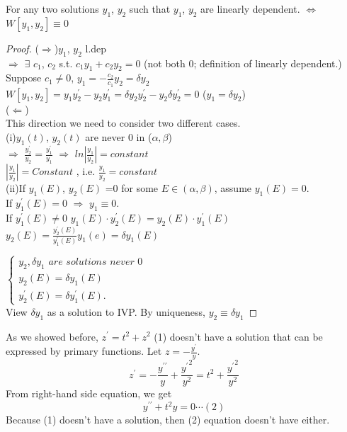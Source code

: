 \begin{proposition}
For any two solutions $y_1$, $y_2$ such that $y_1$, $y_2$ are linearly dependent. $\iff$ $W[y_1,y_2]\equiv0$
\end{proposition}
\begin{proof}
($\Rightarrow$)$y_1$, $y_2$ l.dep\\
$\Rightarrow$ $\exists$ $c_1$, $c_2$ s.t. $c_1y_1+c_2y_2=0$ (not both 0; definition of linearly dependent.)\\
Suppose $c_1\neq0$, $y_1=-\frac{c_2}{c_1}y_2=\delta y_2$\\
$W[y_1,y_2]=y_1y_2^\prime-y_2y_1^\prime=\delta y_2y_2^\prime-y_2\delta y_2^\prime=0$ \qquad ($y_1=\delta y_2$)\\

($\Leftarrow$) \\
This direction we need to consider two different cases. \\
(i)\quad$y_1(t)$, $y_2(t)$ are never 0 in ($\alpha,\beta$)\\
$\Rightarrow$ \quad
$\frac{y_2^\prime}{y_2}=\frac{y_1^\prime}{y_1}$ \quad $\Rightarrow$ $ln|\frac{y_1}{y_2}|=constant$\\
$|\frac{y_1}{y_2}|=Constant$ , i.e. $\frac{y_1}{y_2}=constant$\\
(ii)If $y_1(E)$, $y_2(E)$ =0
 for some $E\in(\alpha,\beta)$, assume $y_1(E)=0$.\\
If $y_1^\prime(E)=0$ $\Rightarrow$ $y_1\equiv0$.\\
If $y_1^\prime(E)\neq0$ \quad$y_1(E)\cdot y_2^\prime(E)=y_2(E)\cdot y_1^\prime(E)$\\
$y_2(E)=\frac{y_2^\prime(E)}{y_1^\prime(E)}y_1(e)=\delta y_1(E)$

$\left \{	\begin{gathered}
y_2, \delta y_1 \textit{ are solutions never 0}\\
y_2(E)=\delta y_1(E)\\
y_2^\prime(E)=\delta y_1^\prime(E).
\end{gathered}\right.$ \\
View $\delta y_1$ as a solution to IVP. By uniqueness, $y_2\equiv\delta y_1$
\end{proof}

As we showed before, $z^\prime=t^2+z^2$ (1) doesn't have a solution that can be expressed by primary functions. Let $z=-\frac{y^\prime}{y}$. 
\[z^\prime=-\frac{y^{\prime\prime}}{y}+\frac{{y^\prime}^2}{y^2}=t^2+\frac{{y^\prime}^2}{y^2}
\]
From right-hand side equation, we get
\[y^{\prime\prime}+t^2y=0 \cdots (2)
\]
Because (1) doesn't have a solution, then (2) equation doesn't have either.\\
